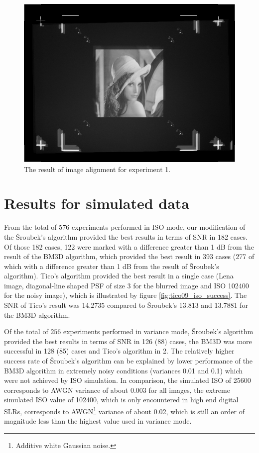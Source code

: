 \documentclass[12pt,notitlepage]{report}
\begin{document}
\begin{figure}[htb]
 \begin{center}
  \includegraphics[width=12cm]{alignment_process.png}
 \end{center}
 \caption{The result of image alignment for experiment 1.}
 \label{fig:alignment_process}
\end{figure}


\section{Results for simulated data}
\label{sec:simulated_data}

From the total of $576$ experiments performed in ISO mode, our modification of the Šroubek's algorithm provided the best results in terms of SNR in 182 cases. Of those 182 cases, 122 were marked with a difference greater than 1 dB from the result of the BM3D algorithm, which provided the best result in 393 cases (277 of which with a difference greater than 1 dB from the result of Šroubek's algorithm). Tico's algorithm provided the best result in a single case (Lena image, diagonal-line shaped PSF of size 3 for the blurred image and ISO 102400 for the noisy image), which is illustrated by figure \ref{fig:tico09_iso_success}.  The SNR of Tico's result was 14.2735 compared to Šroubek's 13.813 and 13.7881 for the BM3D algorithm.

Of the total of $256$ experiments performed in variance mode, Šroubek's algorithm provided the best results in terms of SNR in 126 (88) cases, the BM3D was more successful in 128 (85) cases and Tico's algorithm in 2. The relatively higher success rate of Šroubek's algorithm can be explained by lower performance of the BM3D algorithm in extremely noisy conditions (variances 0.01 and 0.1) which were not achieved by ISO simulation. In comparison, the simulated ISO of 25600 corresponds to AWGN variance of about 0.003 for all images, the extreme simulated ISO value of 102400, which is only encountered in high end digital SLRs, corresponds to AWGN\footnote[6]{Additive white Gaussian noise.} variance of about 0.02, which is still an order of magnitude less than the highest value used in variance mode. 
\end{document}
